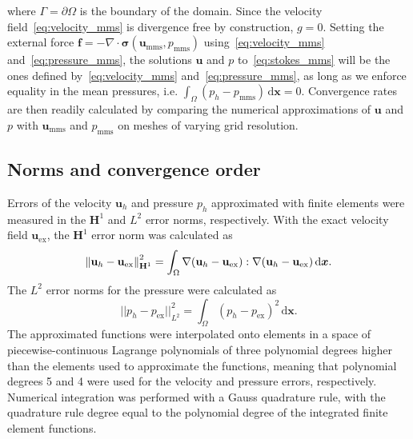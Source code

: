 \documentclass[fleqn]{wlscirep}
\newcommand{\normltwo}[1]{{ \vert\vert#1\vert\vert}_{L^2}}
\newcommand{\Hnorm}[1]{\norm{#1}_{\mathbf{H}^1}}
\newcommand{\intO}[1]{\int_{\Omega}#1 \, \mathrm d\bm{x}}
\newcommand{\ff}{\mathbf{f}}
\newcommand{\uu}{\mathbf{u}}
\newcommand{\bsig}{\bm{\sigma}}
\begin{document}
where $\Gamma=\partial\Omega$ is the boundary of the domain.
Since the velocity field~\eqref{eq:velocity_mms} is divergence free by construction,
$g = 0$. Setting the external force $\ff=-\nabla\cdot\bsig(\uu_{\mathrm{mms}}, p_{\mathrm{mms}})$
using~\eqref{eq:velocity_mms} and~\eqref{eq:pressure_mms},
the solutions $\uu$ and $p$ to~\eqref{eq:stokes_mms} will be the ones
defined by~\eqref{eq:velocity_mms} and~\eqref{eq:pressure_mms},
as long as we enforce equality in the mean pressures, i.e. $\intO{(p_h - p_{\mathrm{mms}})}=0$.
Convergence rates are then readily calculated by comparing the numerical approximations of
$\uu$ and $p$ with $\uu_{\mathrm{mms}}$ and $p_{\mathrm{mms}}$ on meshes of varying grid resolution.

\subsection{Norms and convergence order}\label{subsec:norms_and_eoc}
Errors of the velocity $\uu_h$ and pressure $p_h$ approximated with finite elements
were measured in the $\mathbf{H}^1$ and $L^2$ error norms, respectively.
With the exact velocity field $\uu_{\mathrm{ex}}$, the $\mathbf{H}^1$ error norm was calculated as
\begin{equation*}
    \Hnorm{\uu_h - \uu_{\mathrm{ex}}}^2 = \intO{\nabla(\uu_h - \uu_{\mathrm{ex}}) : \nabla(\uu_h - \uu_{\mathrm{ex}})}.
\end{equation*}
The $L^2$ error norms for the pressure were calculated as
\begin{equation*}
    \normltwo{p_h - p_{\mathrm{ex}}}^2 = \intO{(p_h - p_{\mathrm{ex}})^2}.
\end{equation*}
The approximated functions were interpolated onto elements in a space of piecewise-continuous
Lagrange polynomials of three polynomial degrees higher than the elements used to approximate
the functions, meaning that polynomial degrees 5 and 4 were used for the velocity and pressure
errors, respectively. Numerical integration was performed with a Gauss quadrature rule,
with the quadrature rule degree equal to the polynomial degree of the integrated finite element functions. 
\end{document}
